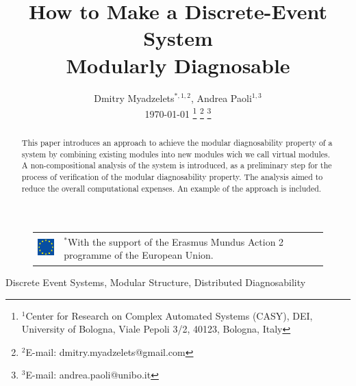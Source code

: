 \documentclass[a4paper, 10pt, conference]{ieeeconf}
\begin{document}
\title{How to Make a Discrete-Event System \\ Modularly Diagnosable}
\author{Dmitry Myadzelets$^{*,1,2}$, Andrea Paoli$^{1,3}$
\\ \today
\thanks{$^{1}$Center for Research on Complex Automated Systems (CASY), DEI,
University of Bologna, Viale Pepoli 3/2, 40123, Bologna, Italy}
	\thanks{$^{2}$E-mail: {dmitry.myadzelets@gmail.com}}
	\thanks{$^{3}$E-mail: {andrea.paoli@unibo.it}}
}
\maketitle

\begin{figure}[!b]
\begin{tabular}{l p{60mm}}
 	\includegraphics[height=10mm]{EU_flag.eps}
 	& \vspace{-10mm} \footnotesize
 	$^{*}$With the support of the Erasmus Mundus Action 2 programme of the
 	European Union.
\end{tabular}
\end{figure}

\begin{abstract}
This paper introduces an approach to achieve the modular diagnosability property
of a system by combining existing modules into new modules wich we call virtual
modules. A non-compositional analysis of the system is introduced, as a
preliminary step for the process of verification of the modular diagnosability
property. The analysis aimed to reduce the overall computational expenses. An
example of the approach is included.
\end{abstract}

\begin{keywords}
Discrete Event Systems, Modular Structure, Distributed Diagnosability
\end{keywords}

\newtheorem{assumption}{Assumption}
\newtheorem{definition}{Definition}
\newtheorem{conjecture}{Conjecture}
\newtheorem{lemma}{Lemma}
\newtheorem{corollary}{Corollary}
\newtheorem{example}{Example}
\newtheorem{theorem}{Theorem}
\end{document}
